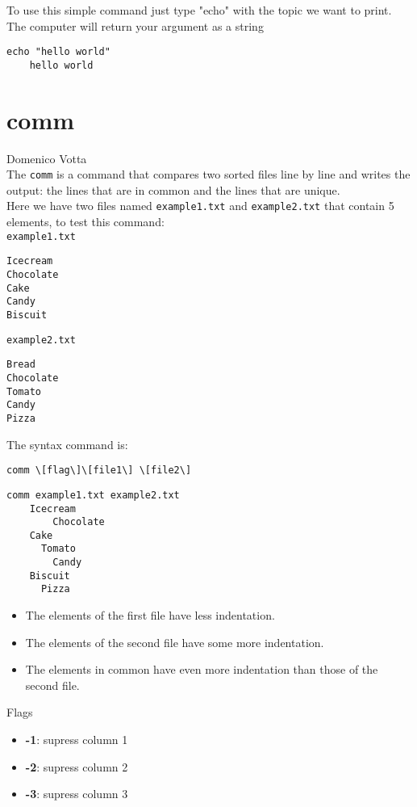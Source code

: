 \documentclass[hidelinks,12pt,a4paper,numbers=enddot]{scrartcl}
\begin{document}
To use this simple command just type "echo" with the topic we want to
print. The computer will return your argument as a string

\begin{verbatim}
echo "hello world"
    hello world
\end{verbatim}

\section{comm}


\large Domenico Votta \normalsize\\


The \texttt{comm} is a command that compares two sorted files
line by line and writes the output: the lines that are in common and the lines that are unique.\\

Here we have two files named \texttt{example1.txt} and
\texttt{example2.txt} that contain 5 elements, to test this command:\\

\texttt{example1.txt}
\begin{verbatim}
Icecream
Chocolate
Cake
Candy
Biscuit
\end{verbatim}

\texttt{example2.txt}
\begin{verbatim}
Bread
Chocolate
Tomato
Candy
Pizza
\end{verbatim}

The syntax command is:
\begin{verbatim}
comm \[flag\]\[file1\] \[file2\]
\end{verbatim}

\begin{verbatim}
comm example1.txt example2.txt
    Icecream
        Chocolate
    Cake
      Tomato
        Candy
    Biscuit
      Pizza
\end{verbatim}

\begin{itemize}
    \item The elements of the first file have less indentation.
    \item The elements of the second file have some more indentation.
    \item The elements in common have even more indentation than those of the second file.
\end{itemize}

Flags

\begin{itemize}
  \item  \textbf{-1}: supress column 1
  \item  \textbf{-2}: supress column 2
  \item  \textbf{-3}: supress column 3
\end{itemize}
\end{document}
